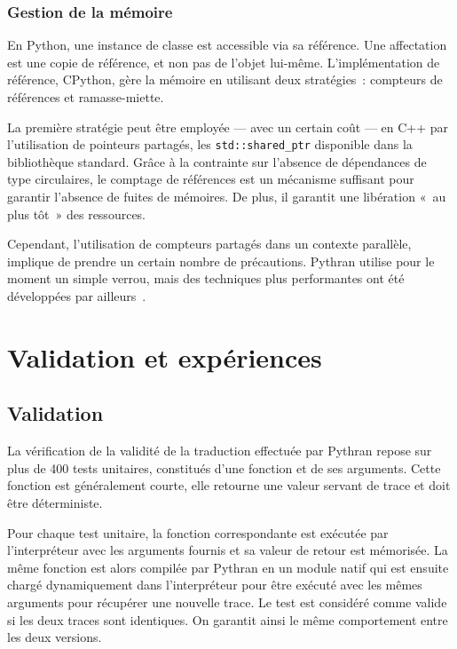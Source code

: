 \documentclass[renpar]{compas2013}
\begin{document}
\subsubsection{Gestion de la mémoire}

En Python, une instance de classe est accessible via sa référence. Une
affectation est une copie de référence, et non pas de l'objet lui-même.
L'implémentation de référence, CPython, gère la mémoire en utilisant deux
stratégies~: compteurs de références et ramasse-miette.

La première stratégie peut être employée --- avec un certain coût --- en
C++ par l'utilisation de pointeurs partagés, les \texttt{std::shared\_ptr}
disponible dans la bibliothèque standard.  Grâce à la contrainte sur
l'absence de dépendances de type circulaires, le comptage de références est
un mécanisme suffisant pour garantir l'absence de fuites de mémoires. De
plus, il garantit une libération «~au plus tôt~» des ressources.

Cependant, l'utilisation de compteurs partagés dans un contexte parallèle,
implique de prendre un certain nombre de précautions. Pythran utilise pour
le moment un simple verrou, mais des techniques plus performantes ont été
développées par ailleurs~\cite{Levanoni2006}.

\section{Validation et expériences}\label{sec:validation}

\subsection{Validation}

La vérification de la validité de la traduction effectuée par Pythran
repose sur plus de 400 tests unitaires, constitués d'une fonction et de ses
arguments.  Cette fonction est généralement courte, elle retourne une
valeur servant de trace et doit être déterministe.

Pour chaque test unitaire, la fonction correspondante est exécutée par
l'interpréteur avec les arguments fournis et sa valeur de retour est
mémorisée. La même fonction est alors compilée par Pythran en un module
natif qui est ensuite chargé dynamiquement dans l'interpréteur pour être
exécuté avec les mêmes arguments pour récupérer une nouvelle trace. Le
test est considéré comme valide si les deux traces sont identiques. On
garantit ainsi le même comportement entre les deux versions.
\end{document}
